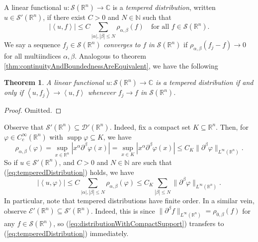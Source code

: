\documentclass{book}
\newcommand{\scrD}{\mathscr{D}}
\newcommand{\scrE}{\mathscr{E}}
\newcommand{\scrS}{\mathscr{S}}
\newcommand{\bbC}{\mathbb{C}}
\newcommand{\bbN}{\mathbb{N}}
\newcommand{\bbR}{\mathbb{R}}
\renewcommand{\phi}{\varphi}
\newcommand{\abs}[1]{\left\lvert {#1} \right\rvert}
\newcommand{\angles}[1]{\left\langle {#1} \right\rangle}
\DeclareMathOperator{\supp}{supp}
\newtheorem{theorem}{Theorem}[chapter]
\theoremstyle{definition}
\theoremstyle{remark}
\numberwithin{equation}{chapter}
\begin{document}
A linear functional $u \colon \scrS(\bbR^n) \to \bbC$ is a \textit{tempered distribution}, written $u \in \scrS'(\bbR^n)$, if there exist $C > 0$ and $N \in \bbN$ such that 
\begin{equation} \label{eq:temperedDistribution}
    \abs{\angles{u,f}} \leq C\sum_{\abs{\alpha},\abs{\beta} \leq N} \rho_{\alpha,\beta}(f) \quad \text{for all } f \in \scrS(\bbR^n).
\end{equation}
We say a sequence $f_j \in \scrS(\bbR^n)$ \textit{converges to} $f$ \textit{in} $\scrS(\bbR^n)$ if $\rho_{\alpha,\beta}(f_j - f) \rightarrow 0$ for all multiindices $\alpha,\beta$. Analogous to theorem \ref{thm:continuityAndBoundednessAreEquivalent}, we have the following 
\begin{theorem}
    A linear functional $u \colon \scrS(\bbR^n) \to \bbC$ is a tempered distribution if and only if $\angles{u,f_j} \rightarrow \angles{u,f}$ whenever $f_j \rightarrow f$ in $\scrS(\bbR^n)$.
\end{theorem}
\begin{proof}
    Omitted.
\end{proof}

Observe that $\scrS'(\bbR^n) \subseteq \scrD'(\bbR^n)$. Indeed, fix a compact set $K \subseteq \bbR^n$. Then, for $\phi \in C_c^\infty(\bbR^n)$ with $\supp{\phi} \subseteq K$, we have 
\begin{equation}
    \rho_{\alpha,\beta}(\phi) = \sup_{x \in \bbR^n} \abs{x^\alpha \partial^\beta \phi(x)}
                              = \sup_{x \in K} \abs{x^\alpha \partial^\beta \phi(x)}
                              \leq C_K \lVert \partial^\beta \phi \rVert_{L^\infty(\bbR^n)}.
\end{equation}
So if $u \in \scrS'(\bbR^n)$, and $C > 0$ and $N \in \bbN$ are such that (\ref{eq:temperedDistribution}) holds, we have 
\begin{equation}
    \abs{\angles{u,\phi}} \leq C \sum_{\abs{\alpha},\abs{\beta} \leq N} \rho_{\alpha,\beta}(\phi)
                          \leq C_K \sum_{\abs{\beta} \leq N} \lVert \partial^\beta \phi \rVert_{L^\infty(\bbR^n)}.
\end{equation}
In particular, note that tempered distributions have finite order. In a similar vein, observe $\scrE'(\bbR^n) \subseteq \scrS'(\bbR^n)$. Indeed, this is since $\lVert \partial^\beta f \rVert_{L^\infty(\bbR^n)} = \rho_{0,\beta}(f)$ for any $f \in \scrS(\bbR^n)$, so (\ref{eq:distributionWithCompactSupport}) transfers to (\ref{eq:temperedDistribution}) immediately.
\end{document}
